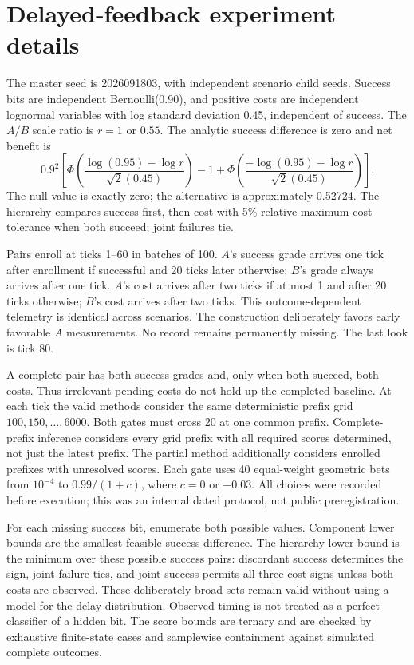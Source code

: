 \section{Delayed-feedback experiment details}
\label{app:async_exp}
The master seed is 2026091803, with independent scenario child seeds.
Success bits are independent Bernoulli(0.90), and positive costs are
independent lognormal variables with log standard deviation 0.45,
independent of success. The $A/B$ scale ratio is $r=1$ or $0.55$.
The analytic success difference is zero and net benefit is
\[
 0.9^2\left[\Phi\!\left(\frac{\log(0.95)-\log r}{\sqrt2(0.45)}\right)
 -1+\Phi\!\left(\frac{-\log(0.95)-\log r}{\sqrt2(0.45)}\right)\right].
\]
The null value is exactly zero; the alternative is approximately 0.52724.
The hierarchy compares success first, then cost with 5\% relative
maximum-cost tolerance when both succeed; joint failures tie.

Pairs enroll at ticks 1--60 in batches of 100. $A$'s success grade arrives
one tick after enrollment if successful and 20 ticks later otherwise;
$B$'s grade always arrives after one tick. $A$'s cost arrives after two
ticks if at most 1 and after 20 ticks otherwise; $B$'s cost arrives after
two ticks. This outcome-dependent telemetry is identical across scenarios.
The construction deliberately favors early favorable $A$ measurements.
No record remains permanently missing. The last look is tick 80.

A complete pair has both success grades and, only when both succeed,
both costs. Thus irrelevant pending costs do not hold up the completed
baseline. At each tick the valid methods consider the same deterministic
prefix grid $100,150,\ldots,6000$. Both gates must cross 20 at one common
prefix. Complete-prefix inference considers every grid prefix with all
required scores determined, not just the latest prefix. The partial
method additionally considers enrolled prefixes with unresolved scores.
Each gate uses 40 equal-weight geometric bets from $10^{-4}$ to
$0.99/(1+c)$, where $c=0$ or $-0.03$. All choices were recorded before
execution; this was an internal dated protocol, not public preregistration.

For each missing success bit, enumerate both possible values. Component
lower bounds are the smallest feasible success difference. The hierarchy
lower bound is the minimum over these possible success pairs: discordant
success determines the sign, joint failure ties, and joint success permits
all three cost signs unless both costs are observed. These deliberately
broad sets remain valid without using a model for the delay distribution.
Observed timing is not treated as a perfect classifier of a hidden bit.
The score bounds are ternary and are checked by exhaustive finite-state
cases and samplewise containment against simulated complete outcomes.

